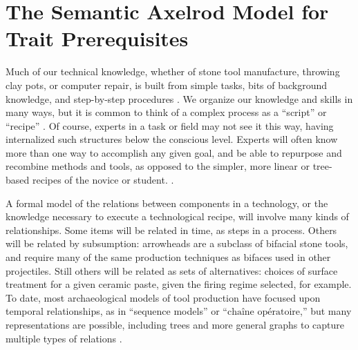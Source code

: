 \documentclass[graybox,natbib]{svmult}
\begin{document}
\section{The Semantic Axelrod Model for Trait
Prerequisites}\label{the-semantic-axelrod-model-for-trait-prerequisites}

Much of our technical knowledge, whether of stone tool manufacture,
throwing clay pots, or computer repair, is built from simple tasks, bits
of background knowledge, and step-by-step procedures
\citep{neff1992ceramics, schiffer1987theory}. We organize our knowledge
and skills in many ways, but it is common to think of a complex process
as a ``script'' or ``recipe'' \citep{schank1977scripts}. Of course,
experts in a task or field may not see it this way, having internalized
such structures below the conscious level. Experts will often know more
than one way to accomplish any given goal, and be able to repurpose and
recombine methods and tools, as opposed to the simpler, more linear or
tree-based recipes of the novice or student.
\citep[e.g.,][]{Bleed:2008in, bleed2002obviously, stout2002skill}.

A formal model of the relations between components in a technology, or
the knowledge necessary to execute a technological recipe, will involve
many kinds of relationships. Some items will be related in time, as
steps in a process. Others will be related by subsumption: arrowheads
are a subclass of bifacial stone tools, and require many of the same
production techniques as bifaces used in other projectiles. Still others
will be related as sets of alternatives: choices of surface treatment
for a given ceramic paste, given the firing regime selected, for
example. To date, most archaeological models of tool production have
focused upon temporal relationships, as in ``sequence models'' or
``$\textrm{cha\^ine op\'eratoire}$,'' but many representations are
possible, including trees and more general graphs to capture multiple
types of relations
\citep{Bamforth:2008kq, Bleed:2008in, Ferguson:2008ce, Hogberg:2008fj, bleed2001trees, bleed2002obviously, schiffer1987theory, stout2002skill}.
\end{document}
